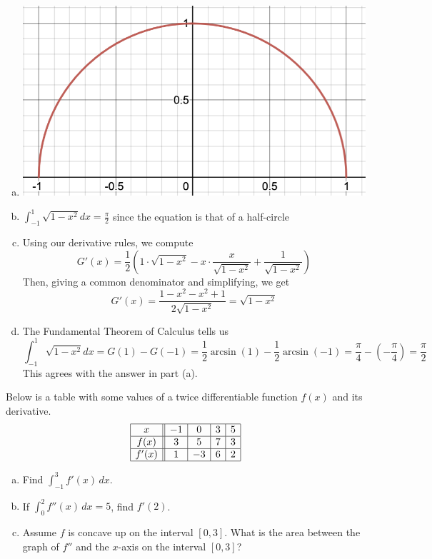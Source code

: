 \documentclass[11pt]{exam}
\begin{document}
\begin{questions}
\begin{solution}
  \begin{enumerate}[(a)]
  \item \includegraphics[scale=0.5]{half-circle-graph}
  \item \(\int_{-1}^1 \sqrt{1-x^2} dx = \frac{\pi}{2}\) since the
    equation is that of a half-circle
  \item Using our derivative rules, we compute \[
      G'(x) = \frac{1}{2}\left( 1 \cdot \sqrt{1-x^2} - 
        x \cdot \frac{x}{\sqrt{1-x^2}} + \frac{1}{\sqrt{1-x^2}} \right) 
    \]
    Then, giving a common denominator and simplifying, we get \[
      G'(x) = \frac{1-x^2-x^2+1}{2 \sqrt{1-x^2}} = \sqrt{1-x^2}
    \]
  \item The Fundamental Theorem of Calculus tells us \[
      \int_{-1}^1 \sqrt{1-x^2} dx = G(1) - G(-1) = \frac{1}{2}\arcsin(1) -
      \frac{1}{2}\arcsin(-1) = \frac{\pi}{4} - \left( -\frac{\pi}{4}
      \right) = \frac{\pi}{2}
    \]
    This agrees with the answer in part (a).
  \end{enumerate}
\end{solution}
\question Below is a table with some values of a twice differentiable function $f(x)$	and its derivative.
	$$\begin{array}{|c||c|c|c|c|}
	\hline
	x & -1 & 0 & 3 & 5 \\
	\hline
	f(x) & 3 & 5 & 7 & 3 \\
	\hline
	f'(x) & 1 & -3 & 6 & 2\\
	\hline	
	\end{array}$$
\begin{enumerate}[(a)]
	\item Find $\displaystyle\int_{-1}^3 f'(x) \, dx$.
	\item If $\displaystyle\int_{0}^2 f''(x) \, dx = 5$, find $f'(2)$.
	\item Assume $f$ is concave up on the interval $[0,3]$. What is the area between the graph of $f''$ and the $x$-axis on the interval $[0,3]$?

\end{enumerate}
\end{questions}
\end{document}
